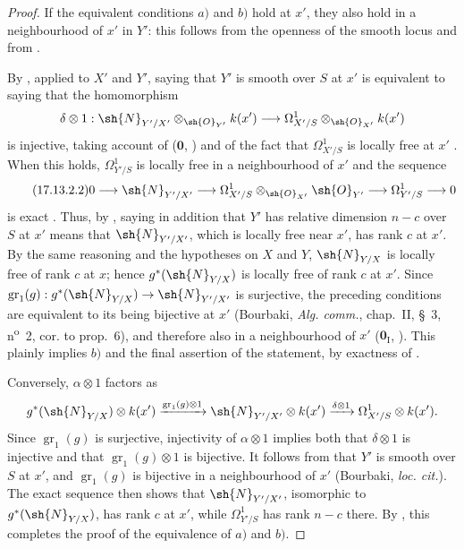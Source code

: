 \begin{proof}
If the equivalent conditions $a)$ and $b)$ hold at $x'$, they also hold in a neighbourhood of $x'$ in $Y'$: this follows from the openness of the smooth locus  and from .

By , applied to $X'$ and $Y'$, saying that $Y'$ is smooth over $S$ at $x'$ is equivalent to saying that the homomorphism
\[
  \delta\otimes1:
  \sh{N}_{Y'/X'}\otimes_{\sh{O}_{Y'}}k(x')
  \longrightarrow
  \Omega^1_{X'/S}\otimes_{\sh{O}_{X'}}k(x')
\]
is injective, taking account of ($\mathbf{0}$, ) and of the fact that $\Omega^1_{X'/S}$ is locally free at $x'$ .
When this holds, $\Omega^1_{Y'/S}$ is locally free in a neighbourhood of $x'$ and the sequence
\begin{equation}
\label{IV.17.13.2.2}
\tag{17.13.2.2}
  0\longrightarrow\sh{N}_{Y'/X'}
  \longrightarrow\Omega^1_{X'/S}\otimes_{\sh{O}_{X'}}\sh{O}_{Y'}
  \longrightarrow\Omega^1_{Y'/S}\longrightarrow0
\end{equation}
is exact .
Thus, by , saying in addition that $Y'$ has relative dimension $n-c$ over $S$ at $x'$ means that $\sh{N}_{Y'/X'}$, which is locally free near $x'$, has rank $c$ at $x'$.
By the same reasoning and the hypotheses on $X$ and $Y$, $\sh{N}_{Y/X}$ is locally free of rank $c$ at $x$; hence $g^*(\sh{N}_{Y/X})$ is locally free of rank $c$ at $x'$.
Since $\operatorname{gr}_1(g):g^*(\sh{N}_{Y/X})\to\sh{N}_{Y'/X'}$ is surjective, the preceding conditions are equivalent to its being bijective at $x'$ (Bourbaki, \emph{Alg. comm.}, chap.~II, \S~3, n\textsuperscript{o}~2, cor. to prop.~6), and therefore also in a neighbourhood of $x'$ ($\mathbf{0}_{\mathrm I}$, ).
This plainly implies $b)$ and the final assertion of the statement, by exactness of .

Conversely, $\alpha\otimes1$ factors as
\[
  g^*(\sh{N}_{Y/X})\otimes k(x')
  \xrightarrow{\operatorname{gr}_1(g)\otimes1}
  \sh{N}_{Y'/X'}\otimes k(x')
  \xrightarrow{\delta\otimes1}
  \Omega^1_{X'/S}\otimes k(x').
\]
Since $\operatorname{gr}_1(g)$ is surjective, injectivity of $\alpha\otimes1$ implies both that $\delta\otimes1$ is injective and that $\operatorname{gr}_1(g)\otimes1$ is bijective.
It follows from  that $Y'$ is smooth over $S$ at $x'$, and $\operatorname{gr}_1(g)$ is bijective in a neighbourhood of $x'$ (Bourbaki, \emph{loc. cit.}).
The exact sequence  then shows that $\sh{N}_{Y'/X'}$, isomorphic to $g^*(\sh{N}_{Y/X})$, has rank $c$ at $x'$, while $\Omega^1_{Y'/S}$ has rank $n-c$ there.
By , this completes the proof of the equivalence of $a)$ and $b)$.


\end{proof}
